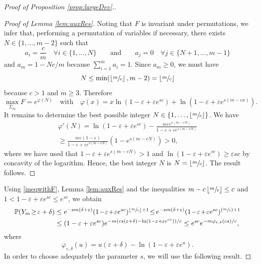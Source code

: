 \documentclass[JEP,XML,SOM,Unicode, NoEqCountersInSection,NoFloatCountersInSection,published]{cedram}
\newcommand{\Psfrac}[2]{(\sfrac{#1}{#2})}
\theoremstyle{definition}
\begin{document}
\begin{proof}[Proof of Proposition \ref{prop:largeDev}.]
\begin{proof}[Proof of Lemma \ref{lem:auxRes}]
Noting that $F$ is invariant under permutations, we infer that, performing a permutation of variables if necessary, there exists $N\in \{ 1,\ldots,m-2\}$ such that
\[
a_i=\frac{c}{m}\quad \forall i\in \{ 1,\ldots,N\} \qquad\textrm{and}\qquad a_j=0\quad \forall j\in \{ N+1,\ldots,m-1\}
\]
and $a_m=1-Nc/m$ because $\sum_{i=1}^ma_i=1$. Since $a_m\geq 0$, we must have
\[
N\leq \min (\left \lfloor{\sfrac{m}{c}}\right \rfloor,m-2 )=\left \lfloor{\sfrac{m}{c}}\right \rfloor
\]
because $c>1$ and $m\geq 3$.
Therefore
\[
\max_{\Sigma_m}F=e^{\varphi(N)}\quad \text{with}\quad \varphi(x)=x\ln (1-\varepsilon+\varepsilon e^{sc})+\ln (1-\varepsilon+\varepsilon e^{s(m-cx)}).
\]
It remains to determine the best possible integer $N\in\{1,\ldots,\left\lfloor{\sfrac{m}{c}}\right \rfloor\}$. We have
\begin{multline*}
\varphi'(N) = \ln (1-\varepsilon+\varepsilon e^{sc})-\frac{sc\varepsilon e^{s(m-cN)}}{1-\varepsilon + \varepsilon e^{s(m-cN)}} \\
\geq \frac{sc\varepsilon (1-\varepsilon)}{1-\varepsilon + \varepsilon e^{s(m-cN)}}(1-e^{s(m-cN)})>0,
\end{multline*}
where we have used that $1-\varepsilon + \varepsilon e^{s(m-cN)}>1$ and $\ln (1-\varepsilon+\varepsilon e^{sc})\geq \varepsilon sc$ by concavity of the logarithm. Hence, the best integer $N$ is $N=\left \lfloor{\sfrac{m}{c}}\right \rfloor$. The result follows.
\end{proof}

Using \eqref{ineqwithF}, Lemma \ref{lem:auxRes} and the inequalities $m-c\left \lfloor{\sfrac{m}{c}}\right \rfloor\leq c$ and $1<1-\varepsilon+\varepsilon e^{sc}\leq e^{sc}$, we obtain
\begin{equation}
\begin{aligned}\label{eq1258}
\mathbb{P}( Y_m \!\geq\! \varepsilon + \delta) &\leq e^{-s m(\delta + \varepsilon)} (1\!-\!\varepsilon\!+\!\varepsilon e^{sc})^{\left \lfloor{\sfrac{m}{c}}\right \rfloor +1}
\!\leq\! e^{-s m(\delta + \varepsilon)} (1\!-\!\varepsilon\!+\!\varepsilon e^{sc})^{\Psfrac{m}{c} +1} \\
&\leq (1-\varepsilon+\varepsilon e^{sc}) e^{- m\left( cs(\varepsilon + \delta) - \ln( 1-\varepsilon+ \varepsilon e^{cs}) \right)/c}
\leq e^{sc} e^{- m\varphi_{\varepsilon,\delta}(cs)/c},
\end{aligned}
\end{equation}
where
\[
\varphi_{\varepsilon,\delta}(u)= u(\varepsilon + \delta) - \ln( 1-\varepsilon + \varepsilon e^{u}).
\]
In order to choose adequately the parameter $s$, we will use the following result.


\end{proof}
\end{document}
